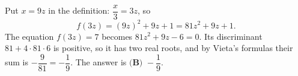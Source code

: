 Put $x=9z$ in the definition: $\dfrac x3=3z$, so
\[f(3z)=(9z)^2+9z+1=81z^2+9z+1.\]
The equation $f(3z)=7$ becomes $81z^2+9z-6=0$. Its discriminant $81+4\cdot81\cdot6$ is positive, so it has two real roots, and by Vieta's formulas their sum is $-\dfrac{9}{81}=-\dfrac19$. The answer is $\boxed{\textbf{(B) }-\dfrac19}$.

